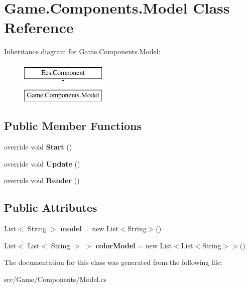 \hypertarget{class_game_1_1_components_1_1_model}{}\section{Game.\+Components.\+Model Class Reference}
\label{class_game_1_1_components_1_1_model}
Inheritance diagram for Game.\+Components.\+Model\+:\begin{figure}[H]
\begin{center}
\leavevmode
\includegraphics[height=2.000000cm]{class_game_1_1_components_1_1_model}
\end{center}
\end{figure}
\subsection*{Public Member Functions}
\begin{DoxyCompactItemize}
\item 
\mbox{\label{class_game_1_1_components_1_1_model_ae7438c8378351cf33450728c6410d49d}} 
override void {\bfseries Start} ()
\item 
\mbox{\label{class_game_1_1_components_1_1_model_abb361907f4eb9412f9b95f6e81526832}} 
override void {\bfseries Update} ()
\item 
\mbox{\label{class_game_1_1_components_1_1_model_aba4beeaf23138d25c8f855c2c067348c}} 
override void {\bfseries Render} ()
\end{DoxyCompactItemize}
\subsection*{Public Attributes}
\begin{DoxyCompactItemize}
\item 
\mbox{\label{class_game_1_1_components_1_1_model_a66f6200b14429fe5de4b34dc89af8251}} 
List$<$ String $>$ {\bfseries model} = new List$<$String$>$()
\item 
\mbox{\label{class_game_1_1_components_1_1_model_ad071eb5b01d238c9ae002ffc6a945d87}} 
List$<$ List$<$ String $>$ $>$ {\bfseries color\+Model} = new List$<$List$<$String$>$$>$()
\end{DoxyCompactItemize}


The documentation for this class was generated from the following file\+:\begin{DoxyCompactItemize}
\item 
src/\+Game/\+Components/Model.\+cs\end{DoxyCompactItemize}
